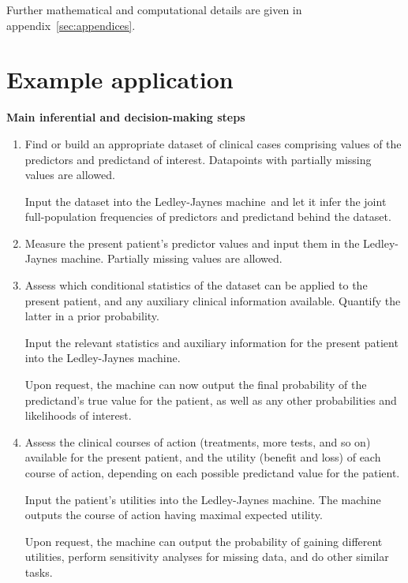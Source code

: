 \documentclass[utf8]{FrontiersinHarvard} %
\renewcommand*{\|}[1][]{\nonscript\:#1\vert\nonscript\:\mathopen{}}
\newcommand*{\ljm}{Ledley-Jaynes machine}
\begin{document}
Further mathematical and computational details are given in appendix~\ref{sec:appendices}.




\bigskip%
\section{Example application}
\label{sec:application}

\begin{table}[t]\centering
    \begin{framed}
      \small
      \caption{\small\bf Main inferential and decision-making steps}\label{tab:main_steps}
      \begin{enumerate}\itemsep1em
        \setcounter{enumi}{-1}
      \item\label{item:learn} Find or build an appropriate dataset of clinical cases comprising values of the predictors and predictand of interest. Datapoints with partially missing values are allowed.

        Input the dataset into the \ljm\ and let it infer the joint full-population frequencies of predictors and predictand behind the dataset.

      \item\label{item:predictors} Measure the present patient's predictor values and input them in the \ljm. Partially missing values are allowed.

      \item\label{item:population} Assess which conditional statistics of the dataset can be applied to the present patient, and any auxiliary clinical information available. Quantify the latter in a prior probability.

        Input the relevant statistics and auxiliary information for the present patient into the \ljm. 

        Upon request, the machine can now output the final probability of the predictand's true value for the patient, as well as any other probabilities and likelihoods of interest.
        
      \item\label{item:utilities} Assess the clinical courses of action (treatments, more tests, and so on) available for the present patient, and the utility (benefit and loss) of each course of action, depending on each possible predictand value for the patient.

        Input the patient's utilities into the \ljm. The machine outputs the course of action having maximal expected utility.

        Upon request, the machine can output the probability of gaining different utilities, perform sensitivity analyses for missing data, and do other similar tasks.
      \end{enumerate}
    \end{framed}
\end{table}
\end{document}
